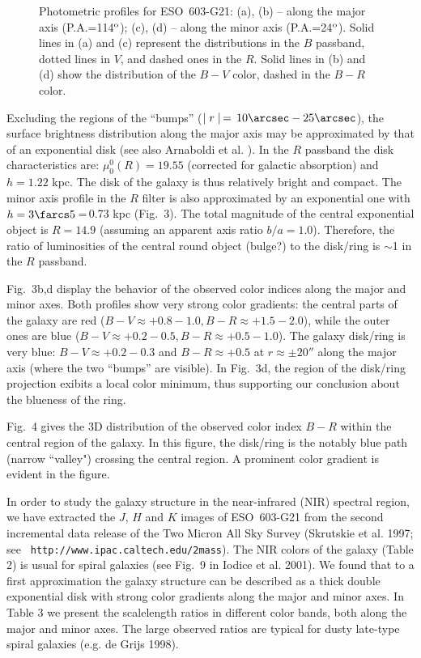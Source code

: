 \documentclass{aa}
\begin{document}
\begin{figure}[!ht]
\centerline{}
\caption[3]{Photometric  profiles  for  ESO~603-G21:  (a), (b) -- along
the major axis (P.A.=114$^{\rm  o}$); (c), (d) -- along the minor axis
(P.A.=24$^{\rm  o}$).  Solid  lines  in  (a)  and  (c)  represent  the
distributions  in the $B$  passband,  dotted  lines in $V$, and dashed
ones in the $R$.  Solid lines in (b) and (d) show the  distribution of
the $B-V$ color, dashed in the $B-R$ color.}
\end{figure}

Excluding the regions of the ``bumps''  ($\mid  r\mid\,=\,10\arcsec  -
25\arcsec$), the surface brightness  distribution along the major axis
may be approximated by that of an exponential disk (see also Arnaboldi
et al.  \cite{a}).  In the $R$ passband the disk characteristics  are:
$\mu_0^0(R)=19.55$  (corrected for galactic  absorption)  and $h=1.22$
kpc.  The disk of the galaxy is thus  relatively  bright and  compact.
The minor axis  profile in the $R$ filter is also  approximated  by an
exponential one with $h=3\farcs  5$\,=\,0.73  kpc (Fig.~3).  The total
magnitude of the central  exponential object is $R=14.9$  (assuming an
apparent axis ratio  $b/a=1.0$).  Therefore, the ratio of luminosities
of the central round object  (bulge?)  to the  disk/ring is $\sim$1 in
the $R$ passband.


Fig.~3b,d display the behavior of the observed color indices along the
major and minor axes.  Both profiles show very strong color gradients:
the central parts of the galaxy are red ($B-V  \approx  +0.8-1.0,  B-R
\approx  +1.5-2.0$),  while  the  outer  ones are blue  ($B-V  \approx
+0.2-0.5, B-R \approx  +0.5-1.0$).  The galaxy disk/ring is very blue:
$B-V \approx  +0.2-0.3$ and $B-R \approx +0.5$ at $r \approx \pm 20''$
along the  major  axis  (where  the two  ``bumps''  are  visible).  In
Fig.~3d, the region of the disk/ring  projection exibits a local color
minimum,  thus  supporting  our  conclusion  about the blueness of the
ring.


Fig.~4 gives the 3D  distribution  of the observed color index $B-R$ within
the central  region of the galaxy.  In this  figure, the  disk/ring  is the
notably blue path (narrow  ``valley")  crossing  the
central region. A prominent color gradient is evident in the figure.

In order to study the galaxy structure in the near-infrared  (NIR) spectral
region, we have  extracted the $J$, $H$ and $K$ images of  {\mbox
ESO~603-G21}  from the second  incremental  data release of the Two Micron
All    Sky     Survey     (Skrutskie     et    al.    1997;     see    {\tt
http://www.ipac.caltech.edu/2mass}).  The NIR colors of the  galaxy  (Table
2) is
usual for spiral  galaxies  (see  Fig.~9 in Iodice et al.  2001).  We found
that to a first  approximation  the galaxy  structure can be described as a
thick double  exponential  disk with strong color gradients along the major
and minor axes.  In Table 3 we present the scalelength  ratios in different
color  bands,  both  along the major and minor  axes.  The  large  observed
ratios are typical  for dusty  late-type  spiral  galaxies  (e.g.  de Grijs
1998).
\end{document}
